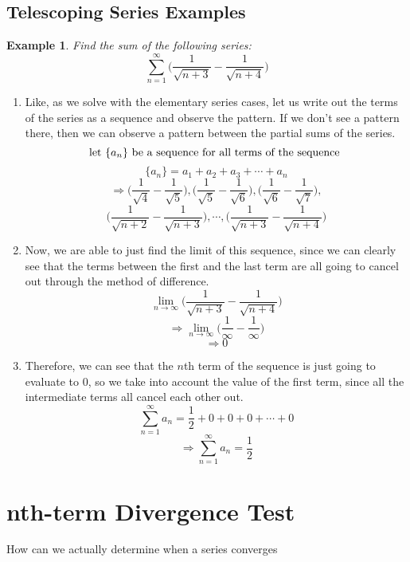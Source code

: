 \documentclass{report}
\newtheorem*{remark*}{Example}
\begin{document}
\begin{sloppypar}
\subsection{Telescoping Series Examples}
\begin{remark*}
  Find the sum of the following series:
  \[ \sum_{n=1}^{\infty} \Biggr( \frac{1}{\sqrt{n + 3}} - \frac{1}{\sqrt{n+4}} \Biggr)\]
\end{remark*}
\begin{enumerate}
  \item Like, as we solve with the elementary
        series cases, let us write out the terms of
        the series as a sequence and observe the pattern.
        If we don't see a pattern there, then we can
        observe a pattern between the partial sums of the
        series.
        \[ \textrm{let $ \{a_{n}\} $ be a sequence
        for all terms of the sequence }\]
        \[ \{a_{n}\} = a_{1} + a_{2} + a_{3} + \cdots +
        a_{n} \]
        \[ \Rightarrow \Biggr( \frac{1}{\sqrt{4}} -
        \frac{1}{\sqrt{5}} \Biggr) , \Biggr( \frac{1}{\sqrt{5}} - \frac{1}{\sqrt{6}} \Biggr),
        \Biggr( \frac{1}{\sqrt{6}} -
        \frac{1}{\sqrt{7}} \Biggr), \]
        \[
        \Biggr( \frac{1}{\sqrt{n+2}} - \frac{1}{\sqrt{n + 3}} \Biggr), \cdots,
        \Biggr( \frac{1}{\sqrt{n+3}} - \frac{1}{\sqrt{n+4}} \Biggr) \]
  \item Now, we are able to just find the limit
        of this sequence, since we can clearly see that the
        terms between the first and the last term are
        all going to cancel out through the method of
        difference.
        \[ \lim_{n \rightarrow \infty} \Biggr( \frac{1}{\sqrt{n+3}} - \frac{1}{\sqrt{n+4}} \Biggr)\]
        \[ \Rightarrow \lim_{n \rightarrow \infty} \Biggr( \frac{1}{\infty} - \frac{1}{\infty} \Biggr)\]
        \[ \Rightarrow 0 \]
  \item Therefore, we can see that the $n$th term
        of the sequence is just going to evaluate to 0,
        so we take into account the value of the first term,
        since all the intermediate terms all cancel each
        other out.
        \[ \sum_{n=1}^{\infty}a_{n} = \frac{1}{2} + 0 + 0 +
        0 + \cdots + 0 \]
        \[ \Rightarrow \sum_{n=1}^{\infty}a_{n} = \frac{1}{2}\]


\end{enumerate}


\section{nth-term Divergence Test}
How can we actually determine when a series converges
\begin{center}
\end{center}


\end{sloppypar}
\end{document}
